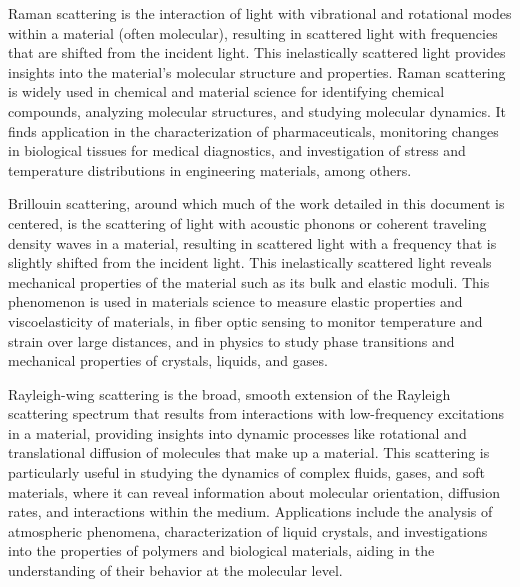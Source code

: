 Raman scattering is the interaction of light with vibrational and rotational modes within a material (often molecular), resulting in scattered light with frequencies that are shifted from the incident light. This inelastically scattered light provides insights into the material's molecular structure and properties. Raman scattering is widely used in chemical and material science for identifying chemical compounds, analyzing molecular structures, and studying molecular dynamics. It finds application in the characterization of pharmaceuticals, monitoring changes in biological tissues for medical diagnostics, and investigation of stress and temperature distributions in engineering materials, among others. \cite{vankeirsbilck2002applications, krafft2015many}

Brillouin scattering, around which much of the work detailed in this document is centered, is the scattering of light with acoustic phonons or coherent traveling density waves in a material, resulting in scattered light with a frequency that is slightly shifted from the incident light. This inelastically scattered light reveals mechanical properties of the material such as its bulk and elastic moduli. This phenomenon is used in materials science to measure elastic properties and viscoelasticity of materials, in fiber optic sensing to monitor temperature and strain over large distances, and in physics to study phase transitions and mechanical properties of crystals, liquids, and gases. \cite{scarcelli2008confocal, horiguchi1990technique, brody1968brillouin}

Rayleigh-wing scattering is the broad, smooth extension of the Rayleigh scattering spectrum that results from interactions with low-frequency excitations in a material, providing insights into dynamic processes like rotational and translational diffusion of molecules that make up a material. This scattering is particularly useful in studying the dynamics of complex fluids, gases, and soft materials, where it can reveal information about molecular orientation, diffusion rates, and interactions within the medium. Applications include the analysis of atmospheric phenomena, characterization of liquid crystals, and investigations into the properties of polymers and biological materials, aiding in the understanding of their behavior at the molecular level. \cite{bodhaine1999rayleigh, amer1975temperature}

